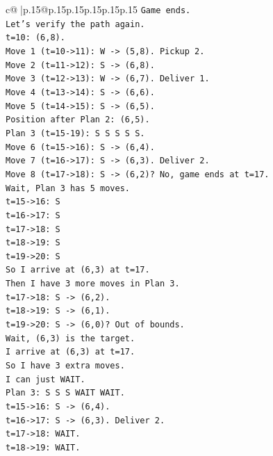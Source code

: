 \documentclass{article}
\begin{document}
{\begin{supertabular}{c@{$\;$}|p{.15\linewidth}@{}p{.15\linewidth}p{.15\linewidth}p{.15\linewidth}p{.15\linewidth}p{.15\linewidth}}
{{{\texttt{Game ends.} \\
\texttt{Let's verify the path again.} \\
\texttt{t=10: (6,8).} \\
\texttt{Move 1 (t=10{-}>11): W {-}> (5,8). Pickup 2.} \\
\texttt{Move 2 (t=11{-}>12): S {-}> (6,8).} \\
\texttt{Move 3 (t=12{-}>13): W {-}> (6,7). Deliver 1.} \\
\texttt{Move 4 (t=13{-}>14): S {-}> (6,6).} \\
\texttt{Move 5 (t=14{-}>15): S {-}> (6,5).} \\
\texttt{Position after Plan 2: (6,5).} \\
\texttt{Plan 3 (t=15{-}19): S S S S S.} \\
\texttt{Move 6 (t=15{-}>16): S {-}> (6,4).} \\
\texttt{Move 7 (t=16{-}>17): S {-}> (6,3). Deliver 2.} \\
\texttt{Move 8 (t=17{-}>18): S {-}> (6,2)? No, game ends at t=17.} \\
\texttt{Wait, Plan 3 has 5 moves.} \\
\texttt{t=15{-}>16: S} \\
\texttt{t=16{-}>17: S} \\
\texttt{t=17{-}>18: S} \\
\texttt{t=18{-}>19: S} \\
\texttt{t=19{-}>20: S} \\
\texttt{So I arrive at (6,3) at t=17.} \\
\texttt{Then I have 3 more moves in Plan 3.} \\
\texttt{t=17{-}>18: S {-}> (6,2).} \\
\texttt{t=18{-}>19: S {-}> (6,1).} \\
\texttt{t=19{-}>20: S {-}> (6,0)? Out of bounds.} \\
\texttt{Wait, (6,3) is the target.} \\
\texttt{I arrive at (6,3) at t=17.} \\
\texttt{So I have 3 extra moves.} \\
\texttt{I can just WAIT.} \\
\texttt{Plan 3: S S S WAIT WAIT.} \\
\texttt{t=15{-}>16: S {-}> (6,4).} \\
\texttt{t=16{-}>17: S {-}> (6,3). Deliver 2.} \\
\texttt{t=17{-}>18: WAIT.} \\
\texttt{t=18{-}>19: WAIT.} \\
}}}
\end{supertabular}}
\end{document}
